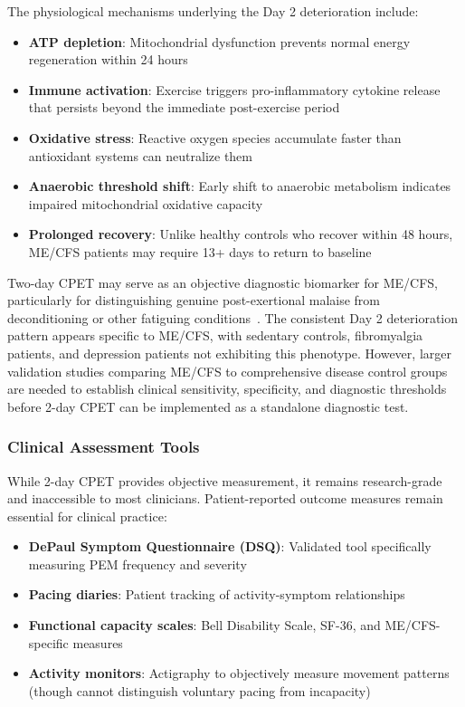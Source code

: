 The physiological mechanisms underlying the Day 2 deterioration include:
\begin{itemize}
    \item \textbf{ATP depletion}: Mitochondrial dysfunction prevents normal energy regeneration within 24 hours~\cite{Syed2025,wang2023wasf3}
    \item \textbf{Immune activation}: Exercise triggers pro-inflammatory cytokine release that persists beyond the immediate post-exercise period
    \item \textbf{Oxidative stress}: Reactive oxygen species accumulate faster than antioxidant systems can neutralize them
    \item \textbf{Anaerobic threshold shift}: Early shift to anaerobic metabolism indicates impaired mitochondrial oxidative capacity
    \item \textbf{Prolonged recovery}: Unlike healthy controls who recover within 48 hours, ME/CFS patients may require 13+ days to return to baseline~\cite{keller2024cpet}
\end{itemize}

\begin{hypothesis}
\label{hyp:cpet-diagnostic}
Two-day CPET may serve as an objective diagnostic biomarker for ME/CFS, particularly for distinguishing genuine post-exertional malaise from deconditioning or other fatiguing conditions~\cite{Lim2020}. The consistent Day 2 deterioration pattern appears specific to ME/CFS, with sedentary controls, fibromyalgia patients, and depression patients not exhibiting this phenotype. However, larger validation studies comparing ME/CFS to comprehensive disease control groups are needed to establish clinical sensitivity, specificity, and diagnostic thresholds before 2-day CPET can be implemented as a standalone diagnostic test.
\end{hypothesis}

\subsubsection{Clinical Assessment Tools}

While 2-day CPET provides objective measurement, it remains research-grade and inaccessible to most clinicians. Patient-reported outcome measures remain essential for clinical practice:

\begin{itemize}
    \item \textbf{DePaul Symptom Questionnaire (DSQ)}: Validated tool specifically measuring PEM frequency and severity
    \item \textbf{Pacing diaries}: Patient tracking of activity-symptom relationships
    \item \textbf{Functional capacity scales}: Bell Disability Scale, SF-36, and ME/CFS-specific measures
    \item \textbf{Activity monitors}: Actigraphy to objectively measure movement patterns (though cannot distinguish voluntary pacing from incapacity)
\end{itemize}

